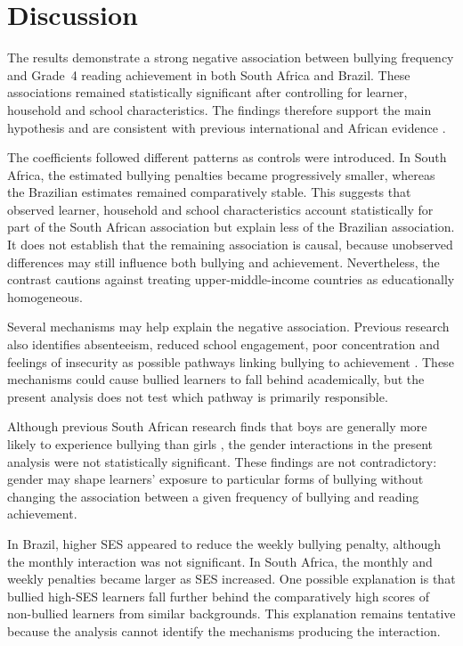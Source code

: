 \section{Discussion}

The results demonstrate a strong negative association between bullying frequency and Grade~4 reading achievement in both South Africa and Brazil. These associations remained statistically significant after controlling for learner, household and school characteristics. The findings therefore support the main hypothesis and are consistent with previous international and African evidence \citep{FRY20186,ozyildirim2024effect,anton_erxleben2016bullying}.

The coefficients followed different patterns as controls were introduced. In South Africa, the estimated bullying penalties became progressively smaller, whereas the Brazilian estimates remained comparatively stable. This suggests that observed learner, household and school characteristics account statistically for part of the South African association but explain less of the Brazilian association. It does not establish that the remaining association is causal, because unobserved differences may still influence both bullying and achievement. Nevertheless, the contrast cautions against treating upper-middle-income countries as educationally homogeneous.

Several mechanisms may help explain the negative association. Previous research also identifies absenteeism, reduced school engagement, poor concentration and feelings of insecurity as possible pathways linking bullying to achievement \citep{FRY20186,anton_erxleben2016bullying}. These mechanisms could cause bullied learners to fall behind academically, but the present analysis does not test which pathway is primarily responsible.

Although previous South African research finds that boys are generally more likely to experience bullying than girls \citep{juan2025risk}, the gender interactions in the present analysis were not statistically significant. These findings are not contradictory: gender may shape learners’ exposure to particular forms of bullying without changing the association between a given frequency of bullying and reading achievement.

In Brazil, higher SES appeared to reduce the weekly bullying penalty, although the monthly interaction was not significant. In South Africa, the monthly and weekly penalties became larger as SES increased. One possible explanation is that bullied high-SES learners fall further behind the comparatively high scores of non-bullied learners from similar backgrounds. This explanation remains tentative because the analysis cannot identify the mechanisms producing the interaction.

